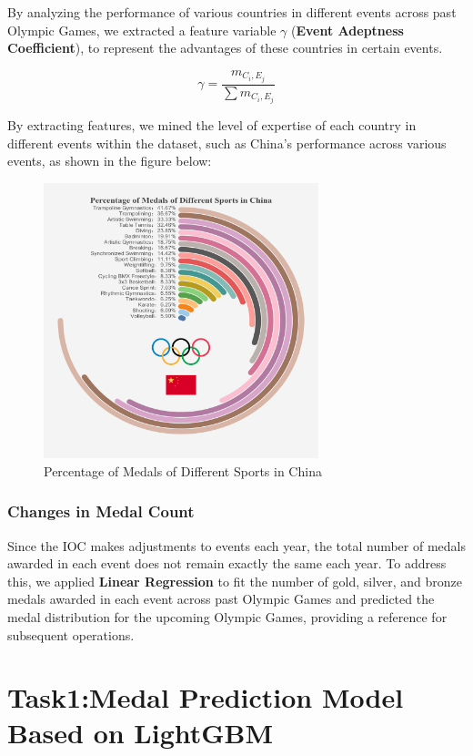 \documentclass[12pt]{article}  %
\begin{document}
By analyzing the performance of various countries in different events across past Olympic Games, we extracted a feature variable $\gamma$ (\textbf{Event Adeptness Coefficient}), to represent the advantages of these countries in certain events.

\begin{equation}
	\gamma = \frac{m_{C_i,E_j}}{\sum m_{C_i,E_j}}
\end{equation}





By extracting features, we mined the level of expertise of each country in different events within the dataset, such as China's performance across various events, as shown in the figure below:

\begin{figure}[H]
	\centering
	\includegraphics[width=8cm]{img/Percentage.jpg}
	\caption{Percentage of Medals of Different Sports in China}
	\label{fig:aa}
\end{figure}


\subsubsection{Changes in Medal Count}
Since the IOC makes adjustments to events each year, the total number of medals awarded in each event does not remain exactly the same each year. To address this, we applied\textbf{ Linear Regression} to fit the number of gold, silver, and bronze medals awarded in each event across past Olympic Games and predicted the medal distribution for the upcoming Olympic Games, providing a reference for subsequent operations.

\section{Task1:Medal Prediction Model Based on LightGBM}
\end{document}
